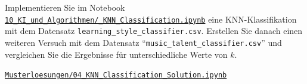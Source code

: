 \begin{myexercise}
    Implementieren Sie im Notebook \href{\notebookurl}{\texttt{10\_KI\_und\_Algorithmen/\_KNN\_Classification.ipynb}} eine KNN-Klassifikation mit dem Datensatz \texttt{learning\_style\_classifier.csv}. Erstellen Sie danach einen weiteren Versuch mit dem Datensatz \enquote{\texttt{music\_talent\_classifier.csv}} und vergleichen Sie die Ergebnisse für unterschiedliche Werte von $k$.

    \begin{myanswer}
        \href{\notebookurl}{\texttt{Musterloesungen/04\_KNN\_Classification\_Solution.ipynb}}
    \end{myanswer}
\end{myexercise}

